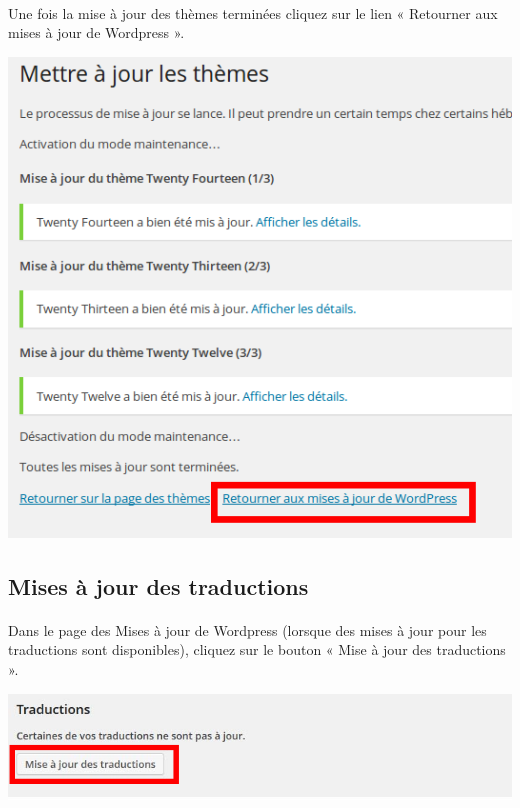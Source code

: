 \documentclass[10pt,a4paper]{article}
\begin{document}
\paragraph{}Une fois la mise à jour des thèmes terminées cliquez sur le lien « Retourner aux mises à jour de Wordpress ».
\begin{center}
\includegraphics[scale=0.35]{img/0056.png}
\end{center}
\subsection{Mises à jour des traductions}
\paragraph{}Dans le page des Mises à jour de Wordpress (lorsque des mises à jour pour les traductions sont disponibles), cliquez sur le bouton « Mise à jour des traductions ».
\begin{center}
\includegraphics[scale=0.35]{img/0057.png}
\end{center}
\end{document}
